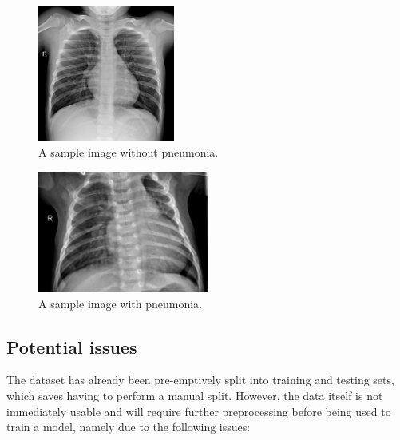 \documentclass[12pt]{report}
\begin{document}
\begin{figure}[H]
    \centering
    \includegraphics[width=0.4\textwidth]{Proposal/SampleNORMAL.jpeg}
    \caption{A sample image without pneumonia.\label{fig:SampleNORMAL}}
\end{figure}

\begin{figure}[H]
    \centering
    \includegraphics[width=0.5\textwidth]{Proposal/SamplePNEUMONIA.jpeg}
    \caption{A sample image with pneumonia.\label{fig:SamplePNEUMONIA}}
\end{figure}

\subsection{Potential issues}\label{sec:DatasetIssues}
The dataset has already been pre-emptively split into training and testing sets, which saves having to perform a manual split. 
However, the data itself is not immediately usable and will require further preprocessing before being used to train a model, namely due to the 
following issues:
\end{document}
